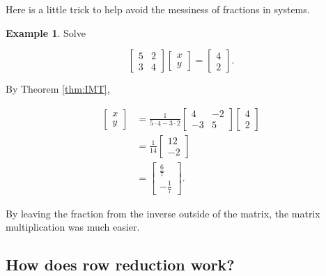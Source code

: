 \documentclass[
]{book}
\theoremstyle{definition}
\theoremstyle{definition}
\newtheorem{example}{Example}[chapter]
\theoremstyle{definition}
\theoremstyle{definition}
\theoremstyle{remark}
\begin{document}
Here is a little trick to help avoid the messiness of fractions in systems.

\begin{examplebox}

\begin{example}
Solve

\[\begin{bmatrix} 5 & 2\\3 & 4\end{bmatrix}\begin{bmatrix}x\\y\end{bmatrix}=\begin{bmatrix} 4\\2\end{bmatrix}.\]

By Theorem \ref{thm:IMT},

\begin{align*}
\begin{bmatrix}x\\y\end{bmatrix}&=\frac{1}{5\cdot4-3\cdot2}\begin{bmatrix}4 & -2\\-3 & 5\end{bmatrix}\begin{bmatrix} 4\\2\end{bmatrix}\\
&=\frac{1}{14}\begin{bmatrix}12\\-2\end{bmatrix}\\
&=\begin{bmatrix}\frac{6}{7}\\-\frac{1}{7}\end{bmatrix}.
\end{align*}

By leaving the fraction from the inverse outside of the matrix, the matrix multiplication was much easier.
\end{example}

\end{examplebox}

\subsection*{How does row reduction work?}\label{how-does-row-reduction-work}
\end{document}
